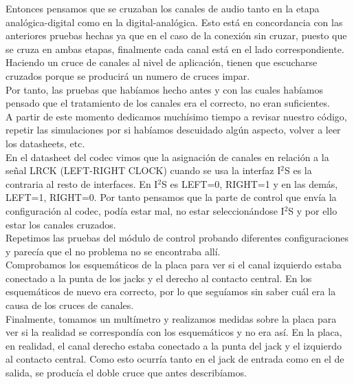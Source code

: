 Entonces pensamos que se cruzaban los canales de audio tanto en la etapa analógica-digital como en la digital-analógica. Esto está en concordancia con las anteriores pruebas hechas ya que en el caso de la conexión sin cruzar, puesto que se cruza en ambas etapas, finalmente cada canal está en el lado correspondiente.\\

Haciendo un cruce de canales al nivel de aplicación, tienen que escucharse cruzados porque se producirá un numero de cruces impar.\\

Por tanto, las pruebas que habíamos hecho antes y con las cuales habíamos pensado que el tratamiento de los canales era el correcto, no eran suficientes.\\

A partir de este momento dedicamos muchísimo tiempo a revisar nuestro código, repetir las simulaciones por si habíamos descuidado algún aspecto, volver a leer los datasheets, etc.\\

En el datasheet del codec vimos que la asignación de canales en relación a la señal LRCK (LEFT-RIGHT CLOCK) cuando se usa la interfaz I$^2$S es la contraria al resto de interfaces. En I$^2$S es LEFT=0, RIGHT=1 y en las demás, LEFT=1, RIGHT=0. Por tanto pensamos que la parte de control que envía la configuración al codec, podía estar mal, no estar seleccionándose I$^2$S y por ello estar los canales cruzados.\\

Repetimos las pruebas del módulo de control probando diferentes configuraciones y parecía que el no problema no se encontraba allí.\\

Comprobamos los esquemáticos de la placa para ver si el canal izquierdo estaba conectado a la punta de los jacks y  el derecho al contacto central. En los esquemáticos de nuevo era correcto, por lo que seguíamos sin saber cuál era la causa de los cruces de canales.\\

Finalmente, tomamos un multímetro y realizamos medidas sobre la placa para ver si la realidad se correspondía con los esquemáticos y no era así. En la placa, en realidad, el canal derecho estaba conectado a la punta del jack y el izquierdo al contacto central. Como esto ocurría tanto en el jack de entrada como en el de salida, se producía el doble cruce que antes describíamos.\\

